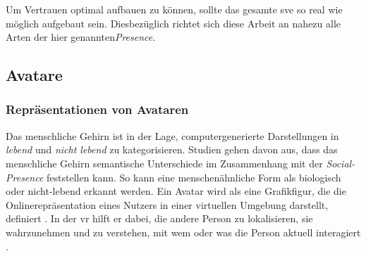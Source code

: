 \documentclass[a4paper,11pt]{article}%
\renewcommand{\\}{\vspace*{0.5\baselineskip} \newline}
\begin{document}
Um Vertrauen optimal aufbauen zu können, sollte das gesamte \ac{sve} so real wie möglich aufgebaut sein. Diesbezüglich richtet sich diese Arbeit an nahezu alle Arten der hier genannten\textit{Presence}.


\newpage

\subsection{Avatare}
\label{Avatare}
\subsubsection{Repräsentationen von Avataren}

Das menschliche Gehirn ist in der Lage, computergenerierte Darstellungen in \textit{lebend} und \textit{nicht lebend} zu kategorisieren. Studien gehen davon aus, dass das menschliche Gehirn semantische Unterschiede im Zusammenhang mit der \textit{Social-Presence} feststellen kann. So kann eine menschenähnliche Form als biologisch oder nicht-lebend erkannt werden. 
Ein Avatar wird als eine Grafikfigur, die die Onlinerepräsentation eines Nutzers in einer virtuellen Umgebung darstellt, definiert \citep[p.1]{neustaedter2009presenting}. In der \ac{vr} hilft er dabei, die andere Person zu lokalisieren, sie wahrzunehmen und zu verstehen, mit wem oder was die Person aktuell interagiert \citep[]{pan2017impact}.
\end{document}
